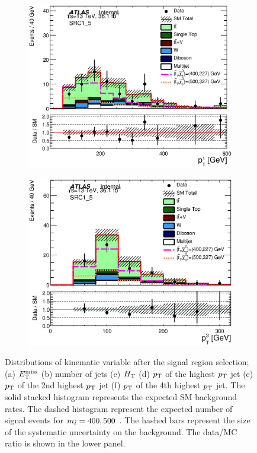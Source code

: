 \begin{figure}[h!]
\begin{center}
\begin{subfigure}[b]{0.40\textwidth}
    	 \includegraphics[width=\textwidth]{figures/plotRegion/JetPt_1__SRC1_5.eps}
                \caption{ }
    \end{subfigure}
    \begin{subfigure}[b]{0.40\textwidth}    
    	 \includegraphics[width=\textwidth]{figures/plotRegion/JetPt_3__SRC1_5.eps}
               \caption{ }
    \end{subfigure}
     \caption[~Distributions of kinematic variable after the signal region selection]{ Distributions of kinematic variable after the signal region selection; (a) $E_{\mathrm{T}}^{\mathrm{miss}}$ (b) number of jets (c) $H_{\mathrm{T}}$ (d) $p_{\mathrm{T}}$ of the highest $p_{\mathrm{T}}$ jet (e) $p_{\mathrm{T}}$ of the 2nd highest $p_{\mathrm{T}}$ jet (f) $p_{\mathrm{T}}$ of the 4th highest $p_{\mathrm{T}}$ jet.  The solid stacked histogram represents the expected SM background rates. The dashed histogram represent the expected number of signal events for $m_{\tilde{t}} = 400,500$ \gev.  The hashed bars represent the size of the systematic uncertainty on the background.  The data/MC ratio is shown in the lower panel. }
  \label{fig:SR1}
    \end{center}
\end{figure}

